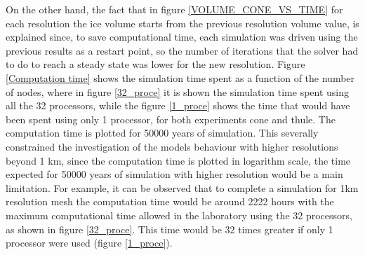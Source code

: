 \documentclass{article}
\begin{document}
On the other hand, the fact that in figure \ref{VOLUME_CONE_VS_TIME} for each resolution the ice volume starts from the previous resolution volume value, is explained since, to save computational time, each simulation was driven using the previous results as a restart point, so the number of iterations that the solver had to do to reach a steady state was lower for the new resolution. Figure \ref{Computation time} shows the simulation time spent as a function of the number of nodes, where in figure \ref{32_proce} it is shown the simulation time spent using all the 32 processors, while the figure \ref{1_proce} shows the time that would have been spent using only 1 processor, for both experiments cone and thule. The computation time is plotted for 50000 years of simulation. This severally constrained the investigation of the models behaviour with higher resolutions beyond 1 km, since the computation time is plotted in logarithm scale, the time expected for 50000 years of simulation with higher resolution would be a main limitation. For example, it can be observed that to complete a simulation for 1km resolution mesh the computation time would be around 2222 hours with the maximum computational time allowed in the laboratory using the 32 processors, as shown in figure \ref{32_proce}. This time would be 32 times greater if only 1 processor were used (figure \ref{1_proce}).
\end{document}
